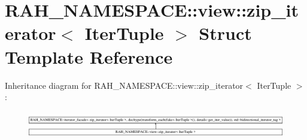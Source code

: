 \hypertarget{struct_r_a_h___n_a_m_e_s_p_a_c_e_1_1view_1_1zip__iterator}{}\section{R\+A\+H\+\_\+\+N\+A\+M\+E\+S\+P\+A\+CE\+::view\+::zip\+\_\+iterator$<$ Iter\+Tuple $>$ Struct Template Reference}
\label{struct_r_a_h___n_a_m_e_s_p_a_c_e_1_1view_1_1zip__iterator}
Inheritance diagram for R\+A\+H\+\_\+\+N\+A\+M\+E\+S\+P\+A\+CE\+::view\+::zip\+\_\+iterator$<$ Iter\+Tuple $>$\+:\begin{figure}[H]
\begin{center}
\leavevmode
\includegraphics[height=1.176471cm]{struct_r_a_h___n_a_m_e_s_p_a_c_e_1_1view_1_1zip__iterator}
\end{center}
\end{figure}
